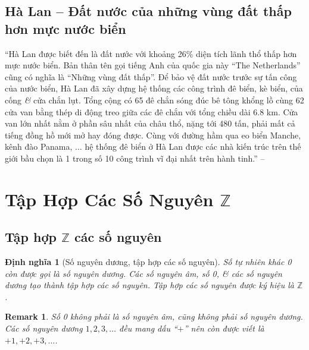 \documentclass[oneside]{book}
\numberwithin{equation}{section}
\newtheorem{dinhnghia}{Định nghĩa}[section]
\newtheorem{remark}{Remark}[section]
\begin{document}
\subsection{Hà Lan -- Đất nước của những vùng đất thấp hơn mực nước biển}
``Hà Lan được biết đến là đất nước với khoảng 26\% diện tích lãnh thổ thấp hơn mực nước biển. Bản thân tên gọi tiếng Anh của quốc gia này ``The Netherlands'' cũng có nghĩa là ``Những vùng đất thấp''. Để bảo vệ đất nước trước sự tấn công của nước biển, Hà Lan đã xây dựng hệ thống các công trình đê biển, kè biển, của cống \textit{\&} cửa chắn lụt. Tổng cộng có 65 đê chắn sóng đúc bê tông khổng lồ cùng 62 cửa van bằng thép di động treo giữa các đê chắn với tổng chiều dài 6.8 km. Cửa van lớn nhất nằm ở phần sâu nhất của châu thổ, nặng tới 480 tấn, phải mất cả tiếng đồng hồ mới mở hay đóng được. Cùng với đường hầm qua eo biển Manche, kênh đào Panama, $\ldots$ hệ thống đê biển ở Hà Lan được các nhà kiến trúc trên thế giới bầu chọn là 1 trong số 10 công trình vĩ đại nhất trên hành tinh.'' -- \cite[p. 63]{Thai_Anh_Dat_Ha_Loan_Nam_Quang_Toan_6_tap_1}

\section{Tập Hợp Các Số Nguyên $\mathbb{Z}$}

\subsection{Tập hợp $\mathbb{Z}$ các số nguyên}

\begin{dinhnghia}[Số nguyên dương, tập hợp các số nguyên]
	Số tự nhiên khác 0 còn được gọi là \emph{số nguyên dương}. Các số nguyên âm, số 0, \textit{\&} các số nguyên dương tạo thành tập hợp các số nguyên. Tập hợp các số nguyên được ký hiệu là $\mathbb{Z}$.
\end{dinhnghia}

\begin{remark}
	Số 0 không phải là số nguyên âm, cũng không phải số nguyên dương. Các số nguyên dương $1,2,3,\ldots$ đều mang dấu ``$+$'' nên còn được viết là $+1,+2,+3,\ldots$.
\end{remark}
\end{document}
